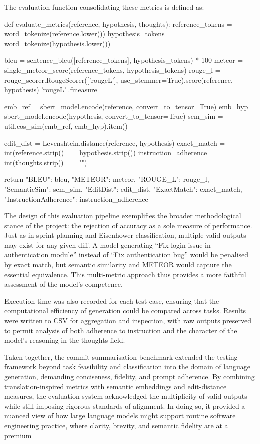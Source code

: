 \documentclass{report}
\begin{document}
The evaluation function consolidating these metrics is defined as:

\begin{python}
def evaluate_metrics(reference, hypothesis, thoughts):
    reference_tokens = word_tokenize(reference.lower())
    hypothesis_tokens = word_tokenize(hypothesis.lower())

    bleu = sentence_bleu([reference_tokens], hypothesis_tokens) * 100
    meteor = single_meteor_score(reference_tokens, hypothesis_tokens)
    rouge_l = rouge_scorer.RougeScorer(['rougeL'], use_stemmer=True).score(reference, hypothesis)['rougeL'].fmeasure

    emb_ref = sbert_model.encode(reference, convert_to_tensor=True)
    emb_hyp = sbert_model.encode(hypothesis, convert_to_tensor=True)
    sem_sim = util.cos_sim(emb_ref, emb_hyp).item()

    edit_dist = Levenshtein.distance(reference, hypothesis)
    exact_match = int(reference.strip() == hypothesis.strip())
    instruction_adherence = int(thoughts.strip() == "")

    return {
        "BLEU": bleu,
        "METEOR": meteor,
        "ROUGE_L": rouge_l,
        "SemanticSim": sem_sim,
        "EditDist": edit_dist,
        "ExactMatch": exact_match,
        "InstructionAdherence": instruction_adherence
    }

\end{python}

The design of this evaluation pipeline exemplifies the broader methodological stance of the project: the rejection of accuracy as a sole measure of performance. 
Just as in sprint planning and Eisenhower classification, multiple valid outputs may exist for any given diff. 
A model generating “Fix login issue in authentication module” instead of “Fix authentication bug” would be penalised by exact match, but semantic similarity and METEOR would capture the essential equivalence. 
This multi-metric approach thus provides a more faithful assessment of the model’s competence.

Execution time was also recorded for each test case, ensuring that the computational efficiency of generation could be compared across tasks. 
Results were written to CSV for aggregation and inspection, with raw outputs preserved to permit analysis of both adherence to instruction and the character of the model’s reasoning in the thoughts field.

Taken together, the commit summarisation benchmark extended the testing framework beyond task feasibility and classification into the domain of language generation, demanding conciseness, fidelity, and prompt adherence. 
By combining translation-inspired metrics with semantic embeddings and edit-distance measures, the evaluation system acknowledged the multiplicity of valid outputs while still imposing rigorous standards of alignment. 
In doing so, it provided a nuanced view of how large language models might support routine software engineering practice, where clarity, brevity, and semantic fidelity are at a premium
\end{document}

